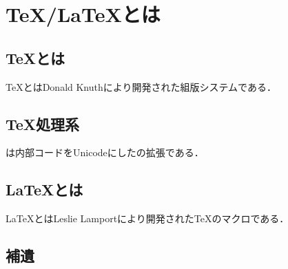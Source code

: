 \documentclass[../../index]{subfiles}
\begin{document}
\chapter{\TeX /\LaTeX とは}
\section{\TeX とは}
\TeX とはDonald Knuthにより開発された組版システムである．

\section{\TeX 処理系}
\upTeX は内部コードをUnicodeにした\pTeX の拡張である．

\begin{comment}
\begin{figure}
  \centering
  \begin{tikzpicture}[graphs/every graph/.style={edges=rounded corners}]
    \matrix[row sep=4mm,column sep=7mm] {
        &
        & \node (LuaTeX) [mapping] {Lua\TeX};
        &
        & \\
        \node (TeX) [terminal] {.tex};
        & \node (upTeX) [mapping] {up\TeX};
        & \node (DVI) [terminal] {.dvi};
        & \node (dvipdfmx) [mapping] {dvipdfmx};
        & \node (PDF) [terminal] {.pdf}; \\
        &
        &
        & \node (PNG) [terminal] {.png};
        & \\
        &
        &
        & \node (dvisvgm) [mapping] {dvisvgm};
        & \node (SVG) [terminal] {.svg}; \\
     };
     \graph [use existing nodes] {
        TeX -- upTeX -> DVI -- dvipdfmx -> PDF;
        TeX --[vh path] LuaTeX ->[hv path] PDF;
        DVI --[vh path] dvisvgm -> SVG;
        PNG -- dvipdfmx;
     };
   \end{tikzpicture}  
  \caption{参考文献を\TeX で管理しない場合のフローチャート}
\end{figure}
\end{comment}

\section{\LaTeX とは}
\LaTeX とはLeslie Lamportにより開発された\TeX のマクロである．

\section{補遺}
\end{document}
